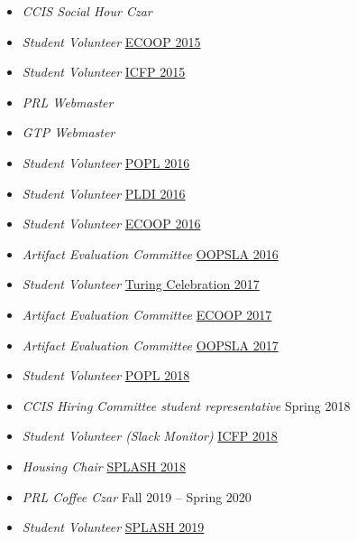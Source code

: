 \documentclass{article}
\begin{document}
\begin{itemize}
  \item \emph{CCIS Social Hour Czar} \hfill {}
  \item \emph{Student Volunteer} \hfill \href{http://2015.ecoop.org/}{ECOOP 2015}
  \item \emph{Student Volunteer} \hfill \href{http://icfpconference.org/icfp2015/}{ICFP 2015}
  \item \emph{PRL Webmaster} \hfill \href{https://github.com/nuprl/website}{}
  \item \emph{GTP Webmaster} \hfill \href{https://github.com/nuprl/gtp.github.io}{}
  \item \emph{Student Volunteer} \hfill \href{http://conf.researchr.org/home/POPL-2016}{POPL 2016}
  \item \emph{Student Volunteer} \hfill \href{http://conf.researchr.org/home/PLDI-2016}{PLDI 2016}
  \item \emph{Student Volunteer} \hfill \href{http://2016.ecoop.org/}{ECOOP 2016}
  \item \emph{Artifact Evaluation Committee} \hfill \href{http://2016.splashcon.org/track/splash-2016-artifacts}{OOPSLA 2016}
  \item \emph{Student Volunteer} \hfill \href{https://www.acm.org/turing-award-50/conference}{Turing Celebration 2017}
  \item \emph{Artifact Evaluation Committee} \hfill \href{https://2017.ecoop.org/track/ecoop-2017-Artifacts}{ECOOP 2017}
  \item \emph{Artifact Evaluation Committee} \hfill \href{https://2017.splashcon.org/track/splash-2017-OOPSLA-Artifacts}{OOPSLA 2017}
  \item \emph{Student Volunteer} \hfill \href{http://conf.researchr.org/home/POPL-2018}{POPL 2018}
  \item \emph{CCIS Hiring Committee student representative} \hfill {Spring 2018}
  \item \emph{Student Volunteer (Slack Monitor)} \hfill \href{https://icfp18.sigplan.org/committee/icfp-2018-organizing-committee}{ICFP 2018}
  \item \emph{Housing Chair} \hfill \href{https://2018.splashcon.org/committee/splash-2018-organizing-committee}{SPLASH 2018}
  \item \emph{PRL Coffee Czar} \hfill {Fall 2019 -- Spring 2020}
  \item \emph{Student Volunteer} \hfill \href{https://2019.splashcon.org/}{SPLASH 2019}

\end{itemize}
\end{document}
